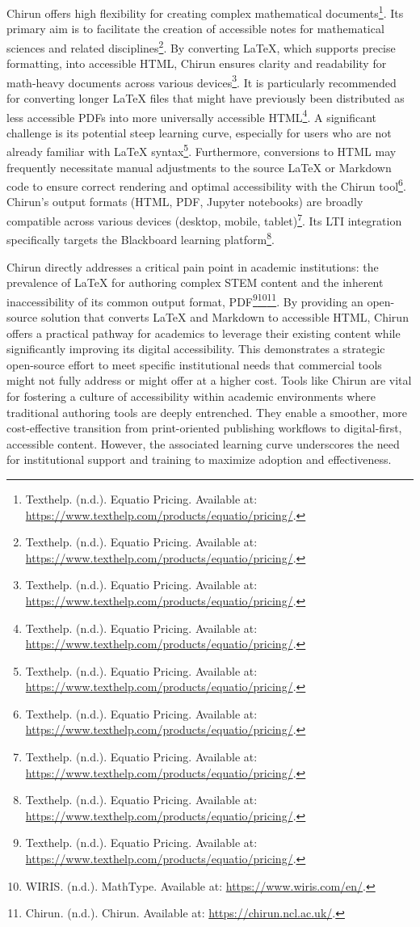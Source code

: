 Chirun offers high flexibility for creating complex mathematical documents\footnote{Texthelp. (n.d.). Equatio Pricing. Available at: \url{https://www.texthelp.com/products/equatio/pricing/}.}. Its primary aim is to facilitate the creation of accessible notes for mathematical sciences and related disciplines\footnote{Texthelp. (n.d.). Equatio Pricing. Available at: \url{https://www.texthelp.com/products/equatio/pricing/}.}. By converting LaTeX, which supports precise formatting, into accessible HTML, Chirun ensures clarity and readability for math-heavy documents across various devices\footnote{Texthelp. (n.d.). Equatio Pricing. Available at: \url{https://www.texthelp.com/products/equatio/pricing/}.}. It is particularly recommended for converting longer LaTeX files that might have previously been distributed as less accessible PDFs into more universally accessible HTML\footnote{Texthelp. (n.d.). Equatio Pricing. Available at: \url{https://www.texthelp.com/products/equatio/pricing/}.}. A significant challenge is its potential steep learning curve, especially for users who are not already familiar with LaTeX syntax\footnote{Texthelp. (n.d.). Equatio Pricing. Available at: \url{https://www.texthelp.com/products/equatio/pricing/}.}. Furthermore, conversions to HTML may frequently necessitate manual adjustments to the source LaTeX or Markdown code to ensure correct rendering and optimal accessibility with the Chirun tool\footnote{Texthelp. (n.d.). Equatio Pricing. Available at: \url{https://www.texthelp.com/products/equatio/pricing/}.}. Chirun's output formats (HTML, PDF, Jupyter notebooks) are broadly compatible across various devices (desktop, mobile, tablet)\footnote{Texthelp. (n.d.). Equatio Pricing. Available at: \url{https://www.texthelp.com/products/equatio/pricing/}.}. Its LTI integration specifically targets the Blackboard learning platform\footnote{Texthelp. (n.d.). Equatio Pricing. Available at: \url{https://www.texthelp.com/products/equatio/pricing/}.}.

Chirun directly addresses a critical pain point in academic institutions: the prevalence of LaTeX for authoring complex STEM content and the inherent inaccessibility of its common output format, PDF\footnote{Texthelp. (n.d.). Equatio Pricing. Available at: \url{https://www.texthelp.com/products/equatio/pricing/}.}\footnote{WIRIS. (n.d.). MathType. Available at: \url{https://www.wiris.com/en/}.}\footnote{Chirun. (n.d.). Chirun. Available at: \url{https://chirun.ncl.ac.uk/}.}. By providing an open-source solution that converts LaTeX and Markdown to accessible HTML, Chirun offers a practical pathway for academics to leverage their existing content while significantly improving its digital accessibility. This demonstrates a strategic open-source effort to meet specific institutional needs that commercial tools might not fully address or might offer at a higher cost. Tools like Chirun are vital for fostering a culture of accessibility within academic environments where traditional authoring tools are deeply entrenched. They enable a smoother, more cost-effective transition from print-oriented publishing workflows to digital-first, accessible content. However, the associated learning curve underscores the need for institutional support and training to maximize adoption and effectiveness.

